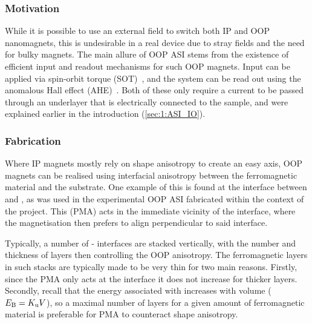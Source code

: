 \subsubsection{Motivation} %
While it is possible to use an external field to switch both IP and OOP nanomagnets, this is undesirable in a real device due to stray fields and the need for bulky magnets.
The main allure of OOP ASI stems from the existence of efficient input and readout mechanisms for such OOP magnets.
Input can be applied via spin-orbit torque (SOT)~\cite{SOT_FM_AFM,SOTswitchingCoPt}, and the system can be read out using the anomalous Hall effect (AHE)~\cite{AHE}.
Both of these only require a current to be passed through an underlayer that is electrically connected to the sample, and were explained earlier in the introduction (\cref{sec:1:ASI_IO}).

\subsubsection{Fabrication} %
Where IP magnets mostly rely on shape anisotropy to create an easy axis, OOP magnets can be realised using interfacial anisotropy between the ferromagnetic material and the substrate.
One example of this is found at the interface between  and , as was used in the experimental OOP ASI fabricated within the context of the \spinengine project.
This  (PMA) acts in the immediate vicinity of the interface, where the magnetisation then prefers to align perpendicular to said interface. \par
Typically, a number of - interfaces are stacked vertically, with the number and thickness of  layers then controlling the OOP anisotropy.
The ferromagnetic layers in such stacks are typically made to be very thin for two main reasons.
Firstly, since the PMA only acts at the interface it does not increase for thicker layers.
Secondly, recall that the energy associated with  increases with volume ($E_\mathrm{B}=K_\mathrm{u}V$), so a maximal number of layers for a given amount of ferromagnetic material is preferable for PMA to counteract shape anisotropy. \par


